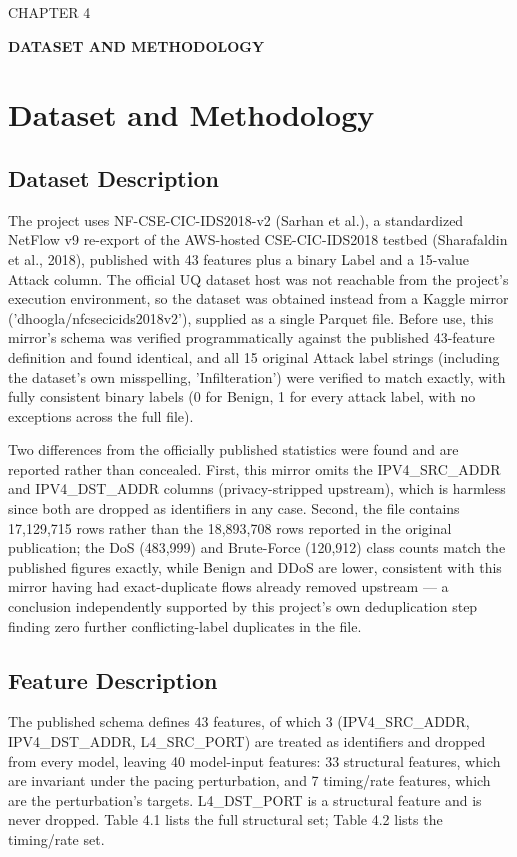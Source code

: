 \documentclass[12pt,a4paper]{report}
\begin{document}
\begin{center}CHAPTER 4\end{center}
\begin{center}\textbf{DATASET AND METHODOLOGY}\end{center}\vspace{4pt}
\chapter{Dataset and Methodology}
\section{Dataset Description}
The project uses NF-CSE-CIC-IDS2018-v2 (Sarhan et al.), a standardized NetFlow v9 re-export of the AWS-hosted CSE-CIC-IDS2018 testbed (Sharafaldin et al., 2018), published with 43 features plus a binary Label and a 15-value Attack column. The official UQ dataset host was not reachable from the project's execution environment, so the dataset was obtained instead from a Kaggle mirror ('dhoogla/nfcsecicids2018v2'), supplied as a single Parquet file. Before use, this mirror's schema was verified programmatically against the published 43-feature definition and found identical, and all 15 original Attack label strings (including the dataset's own misspelling, 'Infilteration') were verified to match exactly, with fully consistent binary labels (0 for Benign, 1 for every attack label, with no exceptions across the full file).

Two differences from the officially published statistics were found and are reported rather than concealed. First, this mirror omits the IPV4\_SRC\_ADDR and IPV4\_DST\_ADDR columns (privacy-stripped upstream), which is harmless since both are dropped as identifiers in any case. Second, the file contains 17,129,715 rows rather than the 18,893,708 rows reported in the original publication; the DoS (483,999) and Brute-Force (120,912) class counts match the published figures exactly, while Benign and DDoS are lower, consistent with this mirror having had exact-duplicate flows already removed upstream --- a conclusion independently supported by this project's own deduplication step finding zero further conflicting-label duplicates in the file.

\section{Feature Description}
The published schema defines 43 features, of which 3 (IPV4\_SRC\_ADDR, IPV4\_DST\_ADDR, L4\_SRC\_PORT) are treated as identifiers and dropped from every model, leaving 40 model-input features: 33 structural features, which are invariant under the pacing perturbation, and 7 timing/rate features, which are the perturbation's targets. L4\_DST\_PORT is a structural feature and is never dropped. Table 4.1 lists the full structural set; Table 4.2 lists the timing/rate set.
\end{document}
